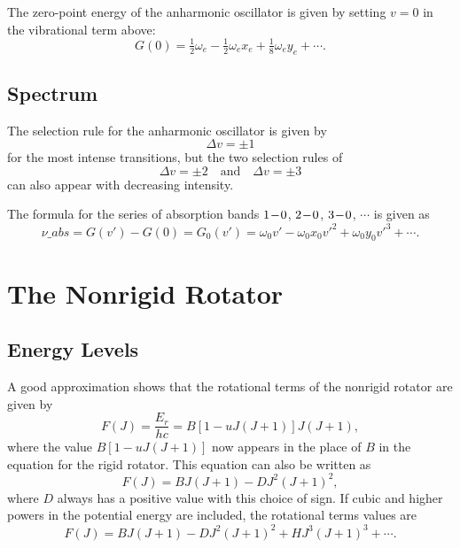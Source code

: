 The zero-point energy of the anharmonic oscillator is given by setting $v = 0$ in the vibrational term above:
\begin{equation*}
    G(0) = \tfrac{1}{2}\omega_{e} - \tfrac{1}{2}\omega_{e}x_{e} + \tfrac{1}{8}\omega_{e}y_{e} + \dotsb.
\end{equation*}

\subsection{Spectrum}

The selection rule for the anharmonic oscillator is given by
\begin{equation*}
    \Delta{}v = \pm 1
\end{equation*}
for the most intense transitions, but the two selection rules of
\begin{equation*}
    \Delta{}v = \pm 2 \quad\text{and}\quad \Delta{}v = \pm 3
\end{equation*}
can also appear with decreasing intensity.

The formula for the series of absorption bands $1\!-\!0$, $2\!-\!0$, $3\!-\!0$, $\dotsb$ is given as
\begin{equation*}
    \nu\_{abs} = G(v') - G(0) = G_{0}(v') = \omega_{0}v' - \omega_{0}x_{0}v'^{2} + \omega_{0}y_{0}v'^{3} + \dotsb.
\end{equation*}

\section{The Nonrigid Rotator}
\label{s:the_nonrigid_rotator}

\subsection{Energy Levels}

A good approximation shows that the rotational terms of the nonrigid rotator are given by
\begin{equation*}
    F(J) = \frac{E_{r}}{hc} = B[1 - uJ(J + 1)]J(J + 1),
\end{equation*}
where the value $B[1 - uJ(J + 1)]$ now appears in the place of $B$ in the equation for the rigid rotator. This equation can also be written as
\begin{equation*}
    F(J) = BJ(J + 1) - DJ^{2}(J + 1)^{2},
\end{equation*}
where $D$ always has a positive value with this choice of sign. If cubic and higher powers in the potential energy are included, the rotational terms values are
\begin{equation*}
    F(J) = BJ(J + 1) - DJ^{2}(J + 1)^{2} + HJ^{3}(J + 1)^{3} + \dotsb.
\end{equation*}

